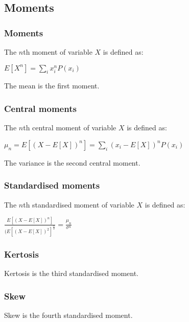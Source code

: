 
\subsection{Moments}

\subsubsection{Moments}

The \(n\)th moment of variable \(X\) is defined as:

\(E[X^n]=\sum_i x_i^n P(x_i)\)

The mean is the first moment.

\subsubsection{Central moments}

The \(n\)th central moment of variable \(X\) is defined as:

\(\mu_n=E[(X-E[X])^n]=\sum_i (x_i-E[X])^n P(x_i)\)

The variance is the second central moment.

\subsubsection{Standardised moments}

The \(n\)th standardised moment of variable \(X\) is defined as:

\(\frac{E[(X-E[X])^n]}{(E[(X-E[X])^2]^\frac{n}{2}}=\frac{\mu_n}{\sigma^n}\)

\subsubsection{Kertosis}

Kertosis is the third standardised moment.

\subsubsection{Skew}

Skew is the fourth standardised moment.

